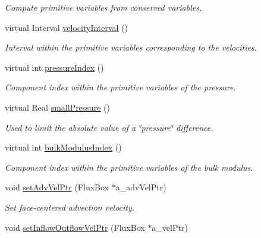 \begin{DoxyCompactItemize}
\begin{DoxyCompactList}\small\item\em Compute primitive variables from conserved variables. \end{DoxyCompactList}\item 
virtual Interval \hyperlink{class_advection_physics_a245ebc2c16520c7f50cc25efc1eb5a0d}{velocity\-Interval} ()
\begin{DoxyCompactList}\small\item\em Interval within the primitive variables corresponding to the velocities. \end{DoxyCompactList}\item 
virtual int \hyperlink{class_advection_physics_a7b88645af918e8ae6ad2ec21eb49734f}{pressure\-Index} ()
\begin{DoxyCompactList}\small\item\em Component index within the primitive variables of the pressure. \end{DoxyCompactList}\item 
virtual Real \hyperlink{class_advection_physics_ae562469a45e542ceb2195ab8f3689db2}{small\-Pressure} ()
\begin{DoxyCompactList}\small\item\em Used to limit the absolute value of a \char`\"{}pressure\char`\"{} difference. \end{DoxyCompactList}\item 
virtual int \hyperlink{class_advection_physics_a2d6f7e55296e5701bb52eeea7610b1e5}{bulk\-Modulus\-Index} ()
\begin{DoxyCompactList}\small\item\em Component index within the primitive variables of the bulk modulus. \end{DoxyCompactList}\item 
\hypertarget{class_advection_physics_a3b6ea2376219a1ff7993a5109c77dcec}{void \hyperlink{class_advection_physics_a3b6ea2376219a1ff7993a5109c77dcec}{set\-Adv\-Vel\-Ptr} (Flux\-Box $\ast$a\-\_\-adv\-Vel\-Ptr)}\label{class_advection_physics_a3b6ea2376219a1ff7993a5109c77dcec}

\begin{DoxyCompactList}\small\item\em Set face-\/centered advection velocity. \end{DoxyCompactList}\item 
\hypertarget{class_advection_physics_ad499a64afa8af4bd84abdfd21963b2dd}{void \hyperlink{class_advection_physics_ad499a64afa8af4bd84abdfd21963b2dd}{set\-Inflow\-Outflow\-Vel\-Ptr} (Flux\-Box $\ast$a\-\_\-vel\-Ptr)}\label{class_advection_physics_ad499a64afa8af4bd84abdfd21963b2dd}


\end{DoxyCompactItemize}

